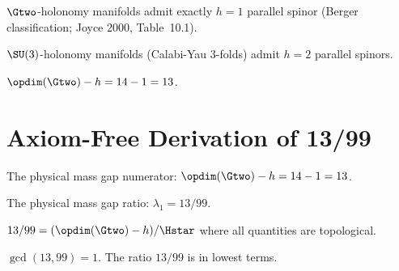 \begin{definition}\label{def:parallel_spinors_G2}
    \leanok
    $\Gtwo$-holonomy manifolds admit exactly $h = 1$ parallel spinor
    (Berger classification; Joyce 2000, Table~10.1).
\end{definition}

\begin{definition}\label{def:parallel_spinors_SU3}
    \leanok
    $\SU(3)$-holonomy manifolds (Calabi-Yau 3-folds) admit $h = 2$ parallel spinors.
\end{definition}

\begin{theorem}\label{thm:physical_spectral_product}
    \leanok
    $\opdim(\Gtwo) - h = 14 - 1 = 13$.
\end{theorem}

\section{Axiom-Free Derivation of 13/99}

\begin{definition}\label{def:physical_gap_num}
    \leanok
    The physical mass gap numerator: $\opdim(\Gtwo) - h = 14 - 1 = 13$.
\end{definition}

\begin{definition}\label{def:physical_gap_ratio}
    \leanok
    The physical mass gap ratio: $\lambda_1 = 13/99$.
\end{definition}

\begin{theorem}\label{thm:physical_gap_topology}
    \leanok
    $13/99 = (\opdim(\Gtwo) - h) / \Hstar$ where all quantities are topological.
\end{theorem}

\begin{theorem}[Irreducibility]\label{thm:physical_gap_irreducible}
    \leanok
    $\gcd(13, 99) = 1$. The ratio $13/99$ is in lowest terms.
\end{theorem}

